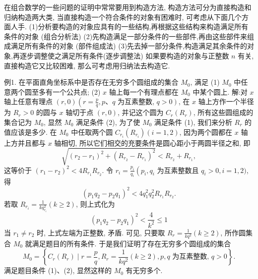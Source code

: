 
在组合数学的一些问题的证明中常常要用到构造方法, 构造方法可分为直接构造和归纳构造两大类, 当直接构造一个符合条件的对象有困难时, 可考虑从下面几个方面人手.
(1)分析要构造的对象应具有的一些结构,再根据这些结构来构造满足所有条件的对象 (组合分析法)
(2)先构造满足一部分条件的一些部件,再由这些部件来组成满足所有条件的对象 (部件组成法)
(3)先去掉一部分条件,构造满足其余条件的对象,再逐步调整使之满足所有条件(逐步调整法)
如果要构造的对象与正整数 $n$ 有关, 直接构造它又比较困难, 那么可考虑用归纳法去构造它.



例1. 在平面直角坐标系中是否存在无穷多个圆组成的集合 $M_0$, 满足
(1) $M_0$ 中任意两个圆至多有一个公共点;
(2) $x$ 轴上每一个有理点都在 $M_0$ 中某个圆上.
解:对 $x$ 轴上任意有理点 $(r, 0)\left(r=\frac{p}{q}, p 、 q\right.$ 为互素整数, $\left.q>0\right)$, 在 $x$ 轴上方作一个半径为 $R_r>0$ 的圆与 $x$ 轴切于点 $(r, 0)$, 并记这个圆为 $C_r\left(R_r\right)$, 所有这些圆组成的集合记为 $M_0$, 显然 $M_0$ 满足条件 (2), 为了使 $M_0$ 满足条件 (1), 我们来分析 $R_r$ 的值应该是多少.
在 $M_0$ 中任取两个圆 $C_{r_i}\left(R_{r_i}\right)(i=1,2)$, 因为两个圆都在 $x$ 轴上方并且都与 $x$ 轴相切, 所以它们相交的充要条件是圆心距小于两圆半径之和, 即
$$
\sqrt{\left(r_2-r_1\right)^2+\left(R_{r_2}-R_{r_1}\right)^2}<R_{r_2}+R_{r_1},
$$
这等价于 $\left(r_1-r_2\right)^2<4 R_{r_1} R_{r_2}$. 令 $r_i=\frac{p_i}{q_i}\left(p_i, q_i\right.$ 为互素整数且 $q_i>0, i= 1,2)$, 得
$$
\left(p_1 q_2-p_2 q_1\right)^2<4 q_1^2 q_2^2 R_{r_1} R_{r_2} .
$$
若取 $R_{r_i}=\frac{1}{k q_{r_i}^2}(k \geqslant 2)$, 则上式化为
$$
\left(p_1 q_2-p_2 q_1\right)^2<\frac{4}{k^2} \leqslant 1
$$
当 $r_1 \neq r_2$ 时, 上式左端为正整数, 矛盾.
可见, 只要取 $R_r=\frac{1}{k q^2}(k \geqslant 2)$, 所作圆集合 $M_0$ 就满足题目的所有条件.
于是我们证明了存在无穷多个圆组成的集合
$$
M_0=\left\{C_r\left(R_r\right) \mid r=\frac{p}{q}, R_r=\frac{1}{k q^2}(k \geqslant 2), p, q \text { 为互素整数, } q>0\right\} .
$$
满足题目条件 (1)、(2), 显然这样的 $M_0$ 有无穷多个.



